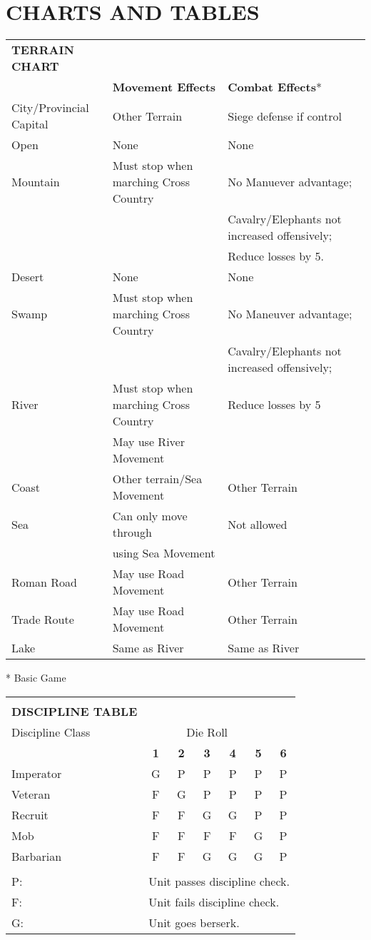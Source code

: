 \clearpage
\section{CHARTS AND TABLES}

\begin{tabular}{|lll|}
  \hline
  \textbf{TERRAIN CHART} & &\\
  & \textbf{Movement Effects} & \textbf{Combat Effects}*\\
  City/Provincial Capital & Other Terrain & Siege defense if control\\
  Open & None & None\\
  Mountain & Must stop when marching Cross Country & No Manuever advantage;\\
  & & Cavalry/Elephants not increased offensively;\\
  & & Reduce losses by 5.\\
  Desert & None & None\\
  Swamp & Must stop when marching Cross Country & No Maneuver advantage;\\
  & & Cavalry/Elephants not increased offensively;\\
  River & Must stop when marching Cross Country & Reduce losses by 5\\
  & May use River Movement &\\
  Coast & Other terrain/Sea Movement & Other Terrain\\
  Sea & Can only move through & Not allowed\\
  & using Sea Movement &\\
  Roman Road & May use Road Movement & Other Terrain\\
  Trade Route & May use Road Movement & Other Terrain\\
  Lake & Same as River & Same as River\\
  \hline
\end{tabular}

* Basic Game

\bigskip

\begin{tabular}{|lcccccc|}
  \hline & & & & & &\\[-2.0ex]
  \textbf{DISCIPLINE TABLE} & & & & & &\\
  Discipline Class & \multicolumn{5}{c}{Die Roll} &\\
  & \textbf{1} & \textbf{2} & \textbf{3} & \textbf{4} & \textbf{5} & \textbf{6}\\
  Imperator & G & P & P & P & P & P\\
  Veteran & F & G & P & P & P & P\\
  Recruit & F & F & G & G & P & P\\
  Mob & F & F & F & F & G & P\\
  Barbarian & F & F & G & G & G & P\\
  & & & & & &\\
  P: & \multicolumn{6}{l}{Unit passes discipline check.}\\
  F: & \multicolumn{6}{l}{Unit fails discipline check.}\\
  G: & \multicolumn{6}{l}{Unit goes berserk.}\\
  \hline
\end{tabular}
